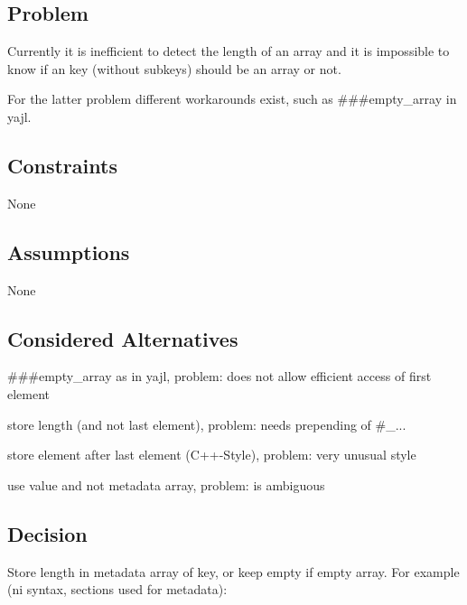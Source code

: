 \subsection*{Problem}

Currently it is inefficient to detect the length of an array and it is impossible to know if an key (without subkeys) should be an array or not.

For the latter problem different workarounds exist, such as {\ttfamily \#\#\#empty\+\_\+array} in {\ttfamily yajl}.

\subsection*{Constraints}


\begin{DoxyItemize}
\item None
\end{DoxyItemize}

\subsection*{Assumptions}


\begin{DoxyItemize}
\item None
\end{DoxyItemize}

\subsection*{Considered Alternatives}


\begin{DoxyItemize}
\item {\ttfamily \#\#\#empty\+\_\+array} as in {\ttfamily yajl}, problem\+: does not allow efficient access of first element
\item store length (and not last element), problem\+: needs prepending of {\ttfamily \#\+\_\+...}
\item store element after last element (C++-\/\+Style), problem\+: very unusual style
\item use value and not metadata array, problem\+: is ambiguous
\end{DoxyItemize}

\subsection*{Decision}

Store length in metadata {\ttfamily array} of key, or keep empty if empty array. For example ({\ttfamily ni syntax}, sections used for metadata)\+:


